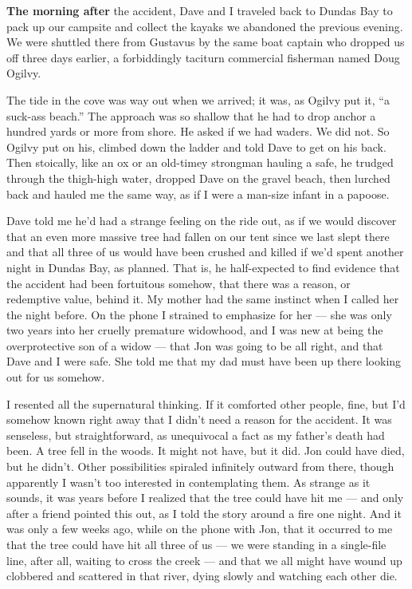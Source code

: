 \textbf{The morning after} the accident, Dave and I traveled back to
Dundas Bay to pack up our campsite and collect the kayaks we abandoned
the previous evening. We were shuttled there from Gustavus by the same
boat captain who dropped us off three days earlier, a forbiddingly
taciturn commercial fisherman named Doug Ogilvy.

The tide in the cove was way out when we arrived; it was, as Ogilvy put
it, ``a suck-ass beach.'' The approach was so shallow that he had to
drop anchor a hundred yards or more from shore. He asked if we had
waders. We did not. So Ogilvy put on his, climbed down the ladder and
told Dave to get on his back. Then stoically, like an ox or an old-timey
strongman hauling a safe, he trudged through the thigh-high water,
dropped Dave on the gravel beach, then lurched back and hauled me the
same way, as if I were a man-size infant in a papoose.

Dave told me he'd had a strange feeling on the ride out, as if we would
discover that an even more massive tree had fallen on our tent since we
last slept there and that all three of us would have been crushed and
killed if we'd spent another night in Dundas Bay, as planned. That is,
he half-expected to find evidence that the accident had been fortuitous
somehow, that there was a reason, or redemptive value, behind it. My
mother had the same instinct when I called her the night before. On the
phone I strained to emphasize for her --- she was only two years into
her cruelly premature widowhood, and I was new at being the
overprotective son of a widow --- that Jon was going to be all right,
and that Dave and I were safe. She told me that my dad must have been up
there looking out for us somehow.

I resented all the supernatural thinking. If it comforted other people,
fine, but I'd somehow known right away that I didn't need a reason for
the accident. It was senseless, but straightforward, as unequivocal a
fact as my father's death had been. A tree fell in the woods. It might
not have, but it did. Jon could have died, but he didn't. Other
possibilities spiraled infinitely outward from there, though apparently
I wasn't too interested in contemplating them. As strange as it sounds,
it was years before I realized that the tree could have hit me --- and
only after a friend pointed this out, as I told the story around a fire
one night. And it was only a few weeks ago, while on the phone with Jon,
that it occurred to me that the tree could have hit all three of us ---
we were standing in a single-file line, after all, waiting to cross the
creek --- and that we all might have wound up clobbered and scattered in
that river, dying slowly and watching each other die.

